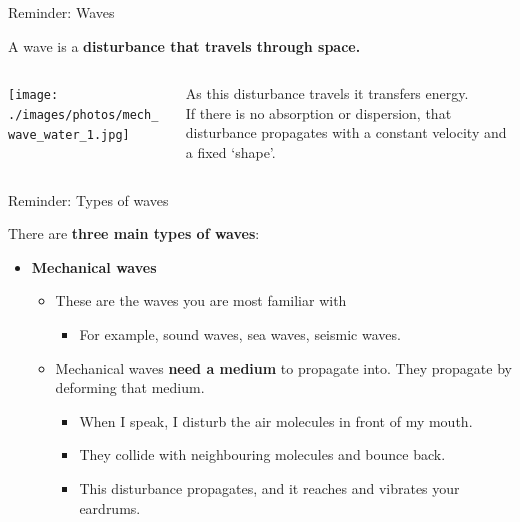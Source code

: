 {
\reminderslide

%
%
%

\begin{frame}{Reminder: Waves}

\begin{center}
 A wave is a {\bf disturbance that travels through space.}
\end{center}

\begin{columns}
  \begin{column}{0.70\textwidth}
    \texttt{[image: ./images/photos/mech\_wave\_water\_1.jpg]}\\
  \end{column}
  \begin{column}{0.30\textwidth}
    \begin{center}
       As this disturbance travels it transfers energy.\\
       \vspace{0.4cm}
       If there is no absorption or dispersion, that disturbance
       propagates with a constant velocity and a fixed `shape'.
    \end{center}
  \end{column}
\end{columns}

\end{frame}

%
%
%

\begin{frame}{Reminder: Types of waves}

There are {\bf three main types of waves}:

\begin{itemize}

\item {\bf Mechanical waves}\\
    \begin{itemize}
        \item These are the waves you are most familiar with
           \begin{itemize}
                \item For example, sound waves, sea waves, seismic waves.
           \end{itemize}
        \item Mechanical waves {\bf need a medium} to propagate into. They propagate by deforming that medium.
           \begin{itemize}
                 \item When I speak, I disturb the air molecules in front of my mouth.
                 \item They collide with neighbouring molecules and bounce back.
                 \item This disturbance propagates, and it reaches and vibrates your eardrums.
           \end{itemize}
    \end{itemize}


\end{itemize}
\end{frame}}
